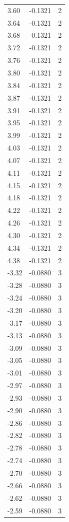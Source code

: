 \begin{longtable}{lrr}
  3.60 & -0.1321 & 2 \\
  3.64 & -0.1321 & 2 \\
  3.68 & -0.1321 & 2 \\
  3.72 & -0.1321 & 2 \\
  3.76 & -0.1321 & 2 \\
  3.80 & -0.1321 & 2 \\
  3.84 & -0.1321 & 2 \\
  3.87 & -0.1321 & 2 \\
  3.91 & -0.1321 & 2 \\
  3.95 & -0.1321 & 2 \\
  3.99 & -0.1321 & 2 \\
  4.03 & -0.1321 & 2 \\
  4.07 & -0.1321 & 2 \\
  4.11 & -0.1321 & 2 \\
  4.15 & -0.1321 & 2 \\
  4.18 & -0.1321 & 2 \\
  4.22 & -0.1321 & 2 \\
  4.26 & -0.1321 & 2 \\
  4.30 & -0.1321 & 2 \\
  4.34 & -0.1321 & 2 \\
  4.38 & -0.1321 & 2 \\
  -3.32 & -0.0880 & 3 \\
  -3.28 & -0.0880 & 3 \\
  -3.24 & -0.0880 & 3 \\
  -3.20 & -0.0880 & 3 \\
  -3.17 & -0.0880 & 3 \\
  -3.13 & -0.0880 & 3 \\
  -3.09 & -0.0880 & 3 \\
  -3.05 & -0.0880 & 3 \\
  -3.01 & -0.0880 & 3 \\
  -2.97 & -0.0880 & 3 \\
  -2.93 & -0.0880 & 3 \\
  -2.90 & -0.0880 & 3 \\
  -2.86 & -0.0880 & 3 \\
  -2.82 & -0.0880 & 3 \\
  -2.78 & -0.0880 & 3 \\
  -2.74 & -0.0880 & 3 \\
  -2.70 & -0.0880 & 3 \\
  -2.66 & -0.0880 & 3 \\
  -2.62 & -0.0880 & 3 \\
  -2.59 & -0.0880 & 3 \\

\end{longtable}
